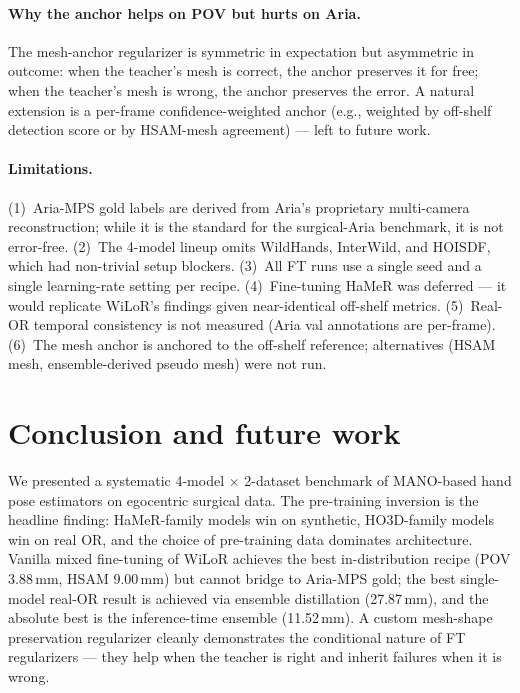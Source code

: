 \documentclass{article}
\begin{document}
\paragraph{Why the anchor helps on POV but hurts on Aria.}
The mesh-anchor regularizer is symmetric in expectation but asymmetric in outcome: when the teacher's mesh is correct, the anchor preserves it for free; when the teacher's mesh is wrong, the anchor preserves the error. A natural extension is a per-frame confidence-weighted anchor (e.g., weighted by off-shelf detection score or by HSAM-mesh agreement) — left to future work.

\paragraph{Limitations.}
(1)~Aria-MPS gold labels are derived from Aria's proprietary multi-camera reconstruction; while it is the standard for the surgical-Aria benchmark, it is not error-free. (2)~The 4-model lineup omits WildHands, InterWild, and HOISDF, which had non-trivial setup blockers. (3)~All FT runs use a single seed and a single learning-rate setting per recipe. (4)~Fine-tuning HaMeR was deferred — it would replicate WiLoR's findings given near-identical off-shelf metrics. (5)~Real-OR temporal consistency is not measured (Aria val annotations are per-frame). (6)~The mesh anchor is anchored to the off-shelf reference; alternatives (HSAM mesh, ensemble-derived pseudo mesh) were not run.

\section{Conclusion and future work}
\label{sec:conclusion}

We presented a systematic 4-model $\times$ 2-dataset benchmark of MANO-based hand pose estimators on egocentric surgical data. The pre-training inversion is the headline finding: HaMeR-family models win on synthetic, HO3D-family models win on real OR, and the choice of pre-training data dominates architecture. Vanilla mixed fine-tuning of WiLoR achieves the best in-distribution recipe (POV 3.88\,mm, HSAM 9.00\,mm) but cannot bridge to Aria-MPS gold; the best single-model real-OR result is achieved via ensemble distillation (27.87\,mm), and the absolute best is the inference-time ensemble (11.52\,mm). A custom mesh-shape preservation regularizer cleanly demonstrates the conditional nature of FT regularizers — they help when the teacher is right and inherit failures when it is wrong.
\end{document}
